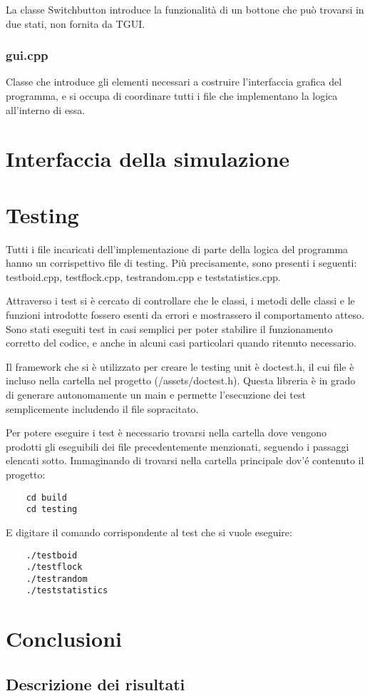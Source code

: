 \documentclass[10pt,a4paper]{article}
\begin{document}
La classe Switchbutton introduce la funzionalità di un bottone che può trovarsi in due stati, non fornita da TGUI.

\subsubsection{gui.cpp}

Classe che introduce gli elementi necessari a costruire l'interfaccia grafica del programma, e si occupa di coordinare tutti i file che implementano la logica all'interno di essa. 

\newpage

\section{Interfaccia della simulazione}
\newpage

\section{Testing}

Tutti i file incaricati dell'implementazione di parte della logica del programma hanno un corrispettivo file di testing. Più precisamente, sono presenti i seguenti: testboid.cpp, testflock.cpp, testrandom.cpp e teststatistics.cpp. 

Attraverso i test si è cercato di controllare che le classi, i metodi delle classi e le funzioni introdotte fossero esenti da errori e mostrassero il comportamento atteso. Sono stati eseguiti test in casi semplici per poter stabilire il funzionamento corretto del codice, e anche in alcuni casi particolari quando ritenuto necessario.

Il framework che si è utilizzato per creare le testing unit è doctest.h, il cui file è incluso nella cartella nel progetto (/assets/doctest.h). Questa libreria è in grado di generare autonomamente un main e permette l'esecuzione dei test semplicemente includendo il file sopracitato.

Per potere eseguire i test è necessario trovarsi nella cartella dove vengono prodotti gli eseguibili dei file precedentemente menzionati, seguendo i passaggi elencati sotto. Immaginando di trovarsi nella cartella principale dov'é contenuto il progetto:

\begin{lstlisting}
    cd build
    cd testing
\end{lstlisting}

E digitare il comando corrispondente al test che si vuole eseguire: 

\begin{lstlisting}
    ./testboid
    ./testflock
    ./testrandom
    ./teststatistics
\end{lstlisting}

\newpage

\section{Conclusioni}

\subsection{Descrizione dei risultati}
\end{document}
